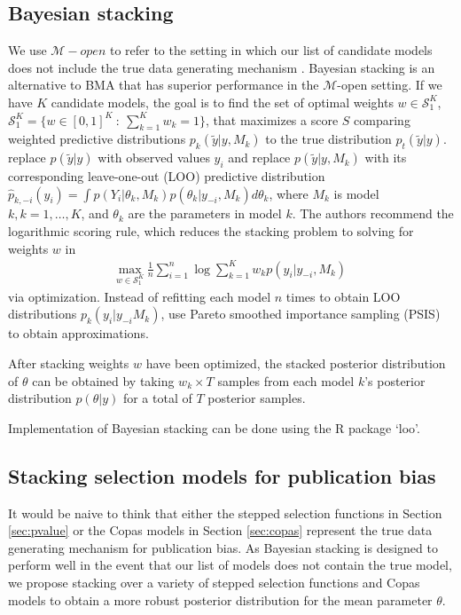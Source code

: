 \documentclass[12pt]{article}   	%
\numberwithin{equation}{section}
\begin{document}
\subsection{Bayesian stacking} \label{sec:stacking}

We use $\mathcal{M}-open$ to refer to the setting in which our list of candidate models does not include the true data generating mechanism \citep{bernardo2009}. Bayesian stacking \citep{yao2018stacking} is an alternative to BMA that has superior performance in the $\mathcal{M}$-open setting. If we have $K$ candidate models, the goal is to find the set of optimal weights $w \in \mathcal{S}_1^K$, $\mathcal{S}_1^K = \{w \in [0,1]^K \: : \: \sum_{k = 1}^K w_k = 1\}$, that maximizes a score $S$ comparing weighted predictive distributions  $p_k(\tilde{y} \vert y, M_k)$ to the true distribution $p_t(\tilde{y} \vert y)$. \citet{yao2018stacking} replace $p(\tilde{y} \vert y)$ with observed values $y_i$ and replace $p(\tilde{y} \vert y, M_k)$ with its corresponding leave-one-out (LOO) predictive distribution $\hat{p}_{k, -i}(y_i) = \int p(Y_i \vert \theta_k, M_k) p(\theta_k \vert y_{-i}, M_k) d\theta_k$, where $M_k$ is model $k, k = 1, \dots, K$, and $\theta_k$ are the parameters in model $k$. The authors recommend the logarithmic scoring rule, which reduces the stacking problem to solving for weights $w$ in 
\begin{align}
\underset{w \in \mathcal{S}_1^K}{\mbox{max}} \: \frac{1}{n} \sum_{i = 1}^n \log \sum_{k = 1}^K w_k p(y_i \vert y_{-i}, M_k)
\end{align}
via optimization. Instead of refitting each model $n$ times to obtain LOO distributions ${p}_{k}(y_i \vert y_{-i} M_k)$, \citet{yao2018stacking} use Pareto smoothed importance sampling (PSIS) \citep{vehtari2017psis} to obtain approximations. 

After stacking weights $w$ have been optimized, the stacked posterior distribution of $\theta$ can be obtained by taking $w_k \times T$ samples from each model $k$'s posterior distribution $p(\theta \vert y)$ for a total of $T$ posterior samples. 


Implementation of Bayesian stacking can be done using the R package `loo'. 


\subsection{Stacking selection models for publication bias}

It would be naive to think that either the stepped selection functions in Section \ref{sec:pvalue} or the Copas models in Section \ref{sec:copas} represent the true data generating mechanism for publication bias. As Bayesian stacking is designed to perform well in the event that our list of models does not contain the true model, we propose stacking over a variety of stepped selection functions and Copas models to obtain a more robust posterior distribution for the mean parameter $\theta$. 
\end{document}
